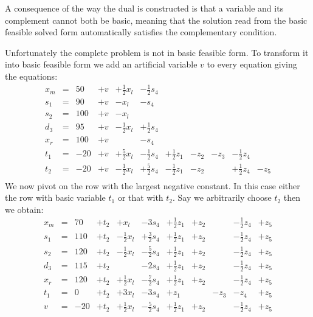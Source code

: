 \documentclass{article}
\begin{document}
A consequence of the way the dual is constructed is that a variable
and its complement cannot both be basic, meaning that the solution
read from the basic feasible
solved form automatically satisfies the complementary condition.

Unfortunately the complete problem
is not in basic feasible form. To transform it
into basic feasible form we add an artificial variable $v$
to every equation giving the equations:
\[
\begin{array}{rlrrrrrrrrr}
x_m & = &50 & + v & + \frac{1}{2} x_l & - \frac{1}{2} s_4 \\
s_1 & = &90  & + v & - x_l &  - s_4 \\
s_2 & = &100  & + v & - x_l \\
d_3 & = &95  & + v & - \frac{1}{2} x_l & + \frac{1}{2} s_4 \\
x_r & = &100  & + v &  & - s_4\\
t_1 & = &-20  & + v & + \frac{5}{2} x_l & - \frac{1}{2} s_4 &
        + \frac{1}{2} z_1 & - z_2 & - z_3 & - \frac{1}{2} z_4 & \\
t_2 & = &-20  & + v & - \frac{1}{2} x_l & + \frac{5}{2} s_4 &
        - \frac{1}{2} z_1 & - z_2 &  & + \frac{1}{2} z_4 & -z_5  \\
\end{array}
\]
We now pivot on the row with the largest negative constant. In this
case either the row with basic variable $t_1$ or that with $t_2$.
 Say we arbitrarily choose $t_2$
then we obtain:
\[
\begin{array}{rlrrrrrrrrr}
x_m & = & 70 & + t_2 &  + x_l & -3 s_4 &
        + \frac{1}{2} z_1 & + z_2 & &  -  \frac{1}{2} z_4 & + z_5 \\
s_1 & = & 110  & + t_2 & - \frac{1}{2} x_l &  + \frac{3}{2} s_4 &
        + \frac{1}{2} z_1 & + z_2 & &  -  \frac{1}{2} z_4 & + z_5 \\
s_2 & = &120  & + t_2 & - \frac{1}{2} x_l & - \frac{5}{2} s_4 &
        + \frac{1}{2} z_1 & + z_2 & &  -  \frac{1}{2} z_4 & + z_5 \\
d_3 & = & 115  & + t_2 &  & - 2 s_4 &
        + \frac{1}{2} z_1 & + z_2 & &  -  \frac{1}{2} z_4 & + z_5 \\
x_r & = &120  & + t_2 & + \frac{1}{2} x_l  & - \frac{7}{2}s_4 &
        + \frac{1}{2} z_1 & + z_2 & &  -  \frac{1}{2} z_4 & + z_5 \\
t_1 & = & 0  & + t_2 & + 3 x_l & -3 s_4 &
        + z_1 &  & - z_3 & - z_4 & + z_5\\
v & = &-20  & + t_2 & +  \frac{1}{2} x_l & - \frac{5}{2} s_4 &
        + \frac{1}{2} z_1 & + z_2 &  & -  \frac{1}{2} z_4 &  +z_5  \\
\end{array}
\]
\end{document}
